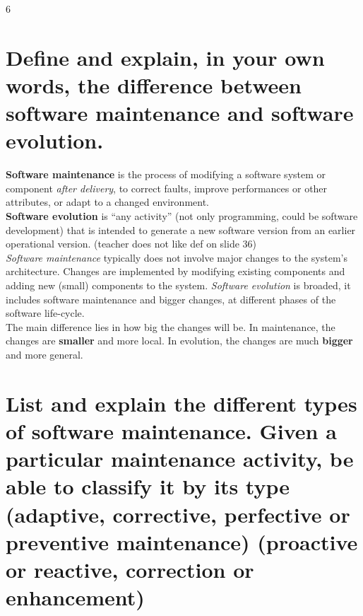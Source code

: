 6\section{Define and explain, in your own words, the difference between
software maintenance and software evolution.}

\textbf{Software maintenance} is the process of modifying a software system or component \textit{after delivery}, to correct faults, improve performances or other attributes, or adapt to a changed environment. \\

\textbf{Software evolution} is \enquote{any activity} (not only programming, could be software development) that is intended to generate a new software version from an earlier operational version.  (teacher does not like def on slide 36)\\

\textit{Software maintenance} typically does not involve major changes to the system's architecture. Changes are implemented by modifying existing components and adding new (small) components to the system. \textit{Software evolution} is broaded, it includes software maintenance and bigger changes, at different phases of the software life-cycle.\\

The main difference lies in how big the changes will be. In maintenance, the changes are \textbf{smaller} and more local. In evolution, the changes are much \textbf{bigger} and more general.

\section{List and explain the different types of software maintenance.
Given a particular maintenance activity, be able to classify it by its type
(adaptive, corrective, perfective or preventive maintenance)
(proactive or reactive, correction or enhancement)}

